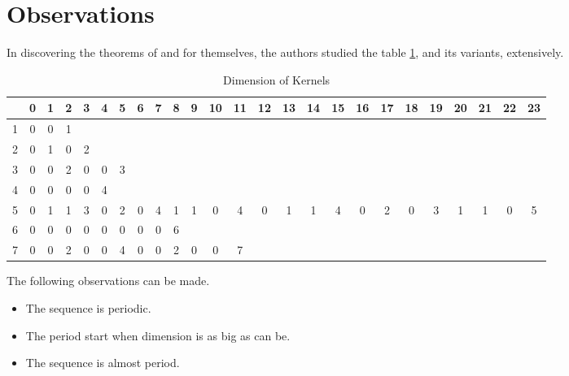 \section{Observations}
In discovering the theorems of \cite{martin01} and \cite{leach17} for
themselves, the authors studied the table \ref{kernels}, and its variants, extensively.

\begin{table}
  \caption{Dimension of Kernels}\label{kernels}
  \fontsize{3}{4}\selectfont
  \begin{tabular}{|c|cccccccccccccccccccccccc|}
    \hline
    & \phantom{0}0 & \phantom{0}1 & \phantom{0}2 & \phantom{0}3 & \phantom{0}4 & \phantom{0}5 & \phantom{0}6 & \phantom{0}7 & \phantom{0}8 & \phantom{0}9 & 10 & 11 & 12 & 13 & 14 & 15 & 16 & 17 & 18 & 19 & 20 & 21 & 22 & 23 \\
    \hline
    \hline
    1 & 0 & 0 & 1 &   &   &   &   &   &   &   &   &   &   &   &   &   &   &   &   &   &   &   &   &   \\
    2 & 0 & 1 & 0 & 2 &   &   &   &   &   &   &   &   &   &   &   &   &   &   &   &   &   &   &   &   \\
    3 & 0 & 0 & 2 & 0 & 0 & 3 &   &   &   &   &   &   &   &   &   &   &   &   &   &   &   &   &   &   \\
    4 & 0 & 0 & 0 & 0 & 4 &   &   &   &   &   &   &   &   &   &   &   &   &   &   &   &   &   &   &   \\
    5 & 0 & 1 & 1 & 3 & 0 & 2 & 0 & 4 & 1 & 1 & 0 & 4 & 0 & 1 & 1 & 4 & 0 & 2 & 0 & 3 & 1 & 1 & 0 & 5 \\
    6 & 0 & 0 & 0 & 0 & 0 & 0 & 0 & 0 & 6 &   &   &   &   &   &   &   &   &   &   &   &   &   &   &   \\
    7 & 0 & 0 & 2 & 0 & 0 & 4 & 0 & 0 & 2 & 0 & 0 & 7 &   &   &   &   &   &   &   &   &   &   &   &   \\
    \hline
  \end{tabular}
\end{table}

The following observations can be made.

\begin{itemize}
\item The sequence is periodic.
\item The period start when dimension is as big as can be.
\item The sequence is almost period.
\end{itemize}

